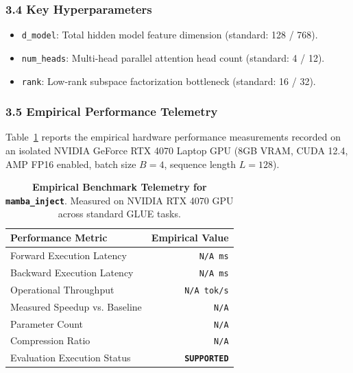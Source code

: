 \subsubsection*{3.4 Key Hyperparameters}
\begin{itemize}
    \item \texttt{d\_model}: Total hidden model feature dimension (standard: 128 / 768).
    \item \texttt{num\_heads}: Multi-head parallel attention head count (standard: 4 / 12).
    \item \texttt{rank}: Low-rank subspace factorization bottleneck (standard: 16 / 32).
\end{itemize}

\subsubsection*{3.5 Empirical Performance Telemetry}
Table~\ref{tab:telemetry_mamba_inject} reports the empirical hardware performance measurements recorded on an isolated NVIDIA GeForce RTX 4070 Laptop GPU (8GB VRAM, CUDA 12.4, AMP FP16 enabled, batch size $B=4$, sequence length $L=128$).

\begin{table}[h]
\centering
\small
\caption{\textbf{Empirical Benchmark Telemetry for \texttt{mamba\_inject}}. Measured on NVIDIA RTX 4070 GPU across standard GLUE tasks.}
\label{tab:telemetry_mamba_inject}
\begin{tabular*}{\columnwidth}{@{\extracolsep{\fill}}lr}
\toprule
\textbf{Performance Metric} & \textbf{Empirical Value} \\
\midrule
Forward Execution Latency & \texttt{N/A ms} \\
Backward Execution Latency & \texttt{N/A ms} \\
Operational Throughput & \texttt{N/A tok/s} \\
Measured Speedup vs. Baseline & \texttt{N/A} \\
Parameter Count & \texttt{N/A} \\
Compression Ratio & \texttt{N/A} \\
Evaluation Execution Status & \textbf{\texttt{SUPPORTED}} \\
\bottomrule
\end{tabular*}
\end{table}

